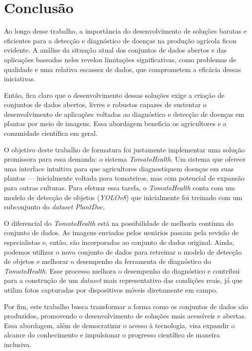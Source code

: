 \chapter{Conclusão}
Ao longo desse trabalho, a importância do desenvolvimento de soluções baratas e eficientes para a detecção e diagnóstico de doenças na produção agrícola ficou evidente. A análise da situação atual dos conjuntos de dados abertos e das aplicações baseadas neles revelou limitações significativas, como problemas de qualidade e uma relativa escassez de dados, que comprometem a eficácia dessas iniciativas.

Então, fica claro que o desenvolvimento dessas soluções exige a criação de conjuntos de dados abertos, livres e robustos capazes de sustentar o desenvolvimento de aplicações voltadas ao diagnóstico e detecção de doenças em plantas por meio de imagens. Essa abordagem beneficia os agricultores e a comunidade científica em geral.

O objetivo deste trabalho de formatura foi justamente implementar uma solução promissora para essa demanda: o sistema \emph{TomatoHealth}. Um sistema que oferece uma interface intuitiva para que agricultores diagnostiquem doenças em suas plantas --- inicialmente voltada para tomateiros, mas com potencial de expansão para outras culturas. Para efetuar essa tarefa, o \emph{TomatoHealth} conta com um modelo de detecção de objetos (\emph{YOLOv8}) que inicialmente foi treinado com um subconjunto do \emph{dataset PlantDoc}.

O diferencial do \emph{TomatoHealth} está na possibilidade de melhoria contínua do conjunto de dados. As imagens enviadas pelos usuários passam pela revisão de especialistas e, então, são incorporadas ao conjunto de dados original. Ainda, podemos utilizar o novo conjunto de dados para retreinar o modelo de detecção de objetos e melhorar o desempenho da ferramenta de diagnóstico do \emph{TomatoHealth}. Esse processo melhora o desempenho do diagnóstico e contribui para a construção de um \emph{dataset} mais representativo das condições reais, já que utiliza fotos capturadas por dispositivos móveis diretamente em campo.

Por fim, este trabalho busca transformar a forma como os conjuntos de dados são produzidos, promovendo o desenvolvimento de soluções mais acessíveis e abertas. Essa abordagem, além de democratizar o acesso à tecnologia, visa expandir o alcance do conhecimento e impulsionar o progresso científico de maneira inclusiva.
